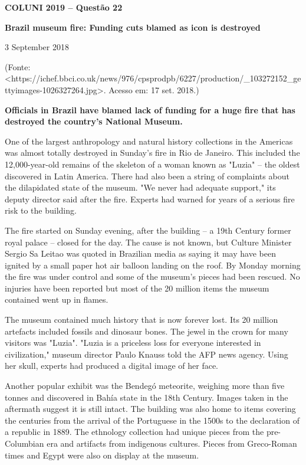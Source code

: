 \textbf{COLUNI 2019 -- Questão 22}\par\medskip \begin{center}\textbf{Brazil museum fire: Funding cuts blamed as icon is destroyed}\end{center}
\begin{flushright}3 September 2018\end{flushright}
\begin{center}(Fonte: <https://ichef.bbci.co.uk/news/976/cpsprodpb/6227/production/_103272152_gettyimages-1026327264.jpg>. Acesso em: 17 set. 2018.)\end{center}

\textbf{Officials in Brazil have blamed lack of funding for a huge fire that has destroyed the country's National Museum.}

One of the largest anthropology and natural history collections in the Americas was almost totally destroyed in Sunday's fire in Rio de Janeiro. This included the 12,000-year-old remains of the skeleton of a woman known as "Luzia" -- the oldest discovered in Latin America. There had also been a string of complaints about the dilapidated state of the museum. "We never had adequate support," its deputy director said after the fire. Experts had warned for years of a serious fire risk to the building.

The fire started on Sunday evening, after the building -- a 19th Century former royal palace -- closed for the day. The cause is not known, but Culture Minister Sergio Sa Leitao was quoted in Brazilian media as saying it may have been ignited by a small paper hot air balloon landing on the roof. By Monday morning the fire was under control and some of the museum's pieces had been rescued. No injuries have been reported but most of the 20 million items the museum contained went up in flames.

The museum contained much history that is now forever lost. Its 20 million artefacts included fossils and dinosaur bones. The jewel in the crown for many visitors was "Luzia". "Luzia is a priceless loss for everyone interested in civilization," museum director Paulo Knauss told the AFP news agency. Using her skull, experts had produced a digital image of her face.

Another popular exhibit was the Bendegó meteorite, weighing more than five tonnes and discovered in Bahía state in the 18th Century. Images taken in the aftermath suggest it is still intact. The building was also home to items covering the centuries from the arrival of the Portuguese in the 1500s to the declaration of a republic in 1889. The ethnology collection had unique pieces from the pre-Columbian era and artifacts from indigenous cultures. Pieces from Greco-Roman times and Egypt were also on display at the museum.

